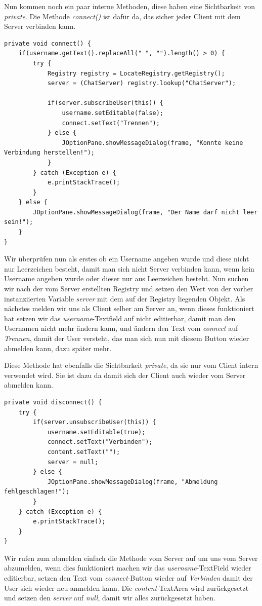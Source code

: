 
Nun kommen noch ein paar interne Methoden, diese haben eine Sichtbarkeit von \textit{private}. Die Methode \textit{connect()} ist dafür da, das sicher jeder Client mit dem Server verbinden kann. 
\begin{lstlisting}
private void connect() {
	if(username.getText().replaceAll(" ", "").length() > 0) {
		try {
			Registry registry = LocateRegistry.getRegistry();
			server = (ChatServer) registry.lookup("ChatServer");

			if(server.subscribeUser(this)) {
				username.setEditable(false);
				connect.setText("Trennen");
			} else {
				JOptionPane.showMessageDialog(frame, "Konnte keine Verbindung herstellen!");
			}
		} catch (Exception e) {
			e.printStackTrace();
		}
	} else {
		JOptionPane.showMessageDialog(frame, "Der Name darf nicht leer sein!");
	}
}
\end{lstlisting}
Wir überprüfen nun als erstes ob ein Username angeben wurde und diese nicht nur Leerzeichen besteht, damit man sich nicht Server verbinden kann, wenn kein Username angeben wurde oder dieser nur aus Leerzeichen besteht. Nun suchen wir nach der vom Server erstellten Registry und setzen den Wert von der vorher instanziierten Variable \textit{server} mit dem auf der Registry liegenden Objekt. Als nächstes melden wir uns als Client selber am Server an, wenn dieses funktioniert hat setzen wir das \textit{username}-Textfield auf nicht editierbar, damit man den Usernamen nicht mehr ändern kann, und ändern den Text vom \textit{connect} auf \textit{Trennen}, damit der User versteht, das man sich nun mit diesem Button wieder abmelden kann, dazu später mehr.


Diese Methode hat ebenfalls die Sichtbarkeit \textit{private}, da sie nur vom Client intern verwendet wird. Sie ist dazu da damit sich der Client auch wieder vom Server abmelden kann.
\begin{lstlisting}
private void disconnect() {
	try {
		if(server.unsubscribeUser(this)) {
			username.setEditable(true);
			connect.setText("Verbinden");
			content.setText("");
			server = null;
		} else {
			JOptionPane.showMessageDialog(frame, "Abmeldung fehlgeschlagen!");
		}
	} catch (Exception e) {
		e.printStackTrace();
	}
}
\end{lstlisting}
Wir rufen zum abmelden einfach die Methode vom Server auf um uns vom Server abzumelden, wenn dies funktioniert machen wir das \textit{username}-TextField wieder editierbar, setzen den Text vom \textit{connect}-Button wieder auf \textit{Verbinden} damit der User sich wieder neu anmelden kann. Die \textit{content}-TextArea wird zurückgesetzt und setzen den \textit{server} auf \textit{null}, damit wir alles zurückgesetzt haben.

